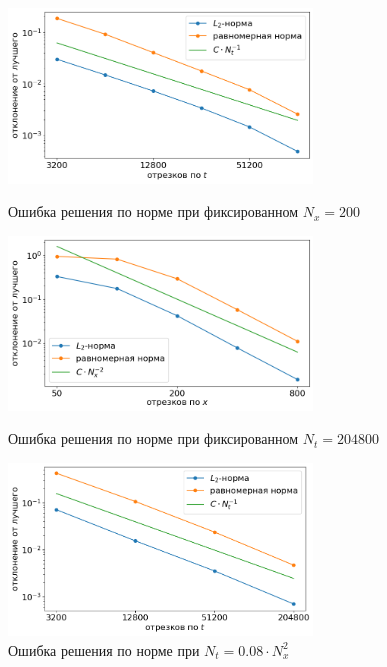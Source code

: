 \begin{figure}[!tp]
	\centering
	\includegraphics[width=0.72\textwidth]{figures/convergence_fixed_nx.png}
	\vspace{-0.2cm}
	\caption{Ошибка решения по норме при фиксированном $N_x = 200$}
	\label{fig:convergence_fixed_nx}
	\vspace{0.6cm}
	
	\includegraphics[width=0.72\textwidth]{figures/convergence_fixed_nt.png}
	\vspace{-0.2cm}
	\caption{Ошибка решения по норме при фиксированном $N_t = 204800$}
	\label{fig:convergence_fixed_nt}
	\vspace{0.6cm}
	
	\includegraphics[width=0.72\textwidth]{figures/convergence_connected.png}
	\vspace{-0.2cm}
	\caption{Ошибка решения по норме при $N_t = 0.08 \cdot N_x^2$}
	\label{fig:convergence_connected}
\end{figure}

